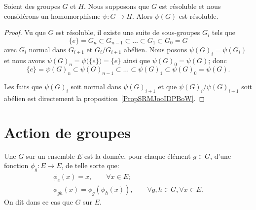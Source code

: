 \begin{proposition} \label{PropBNEZooJMDFIB}
    Soient des groupes \( G\) et \( H\). Nous supposons que \( G\) est résoluble et nous considérons un homomorphisme \( \psi\colon G\to H\). Alors \( \psi(G)\) est résoluble.
\end{proposition}

\begin{proof}
    Vu que \( G\) est résoluble, il existe une suite de sous-groupes \( G_i\) tels que
    \begin{equation}
        \{ e \}=G_n\subset G_{n-1}\subset\ldots\subset G_1\subset G_0=G
    \end{equation}
    avec \( G_i\) normal dans \( G_{i+1}\) et \( G_i/G_{i+1}\) abélien. Nous posons \( \psi(G)_i=\psi(G_i)\) et nous avons \( \psi(G)_n=\psi\big( \{ e \} \big)=\{ e \}\) ainsi que \( \psi(G)_0=\psi(G)\); donc
    \begin{equation}
        \{ e \}=\psi(G)_n\subset \psi(G)_{n-1}\subset\ldots\subset \psi(G)_1\subset \psi(G)_0=\psi(G).
    \end{equation}

    Les faits que \( \psi(G)_i\) soit normal dans \( \psi(G)_{i+1}\) et que \( \psi(G)_i/\psi(G)_{i+1}\) soit abélien est directement la proposition~\ref{PropSRMJooIDPBoW}.

\end{proof}

\section{Action de groupes}

\begin{definition}  \label{DefActionGroupe}
    Une  \( G\) sur un ensemble \( E\) est la donnée, pour chaque élément \( g \in G\), d'une fonction \(\phi_g : E \to E \), de telle sorte que:
    \begin{gather*}
        \phi_{e}(x) = x, \hspace{2em} \forall x \in E;\\
        \phi_{gh}(x) = \phi_g (\phi_h (x)),  \hspace{2em} \forall g,h \in G, \forall x \in E.
     \end{gather*}
     On dit dans ce cas que \( G \)  sur \( E \).
\end{definition}

